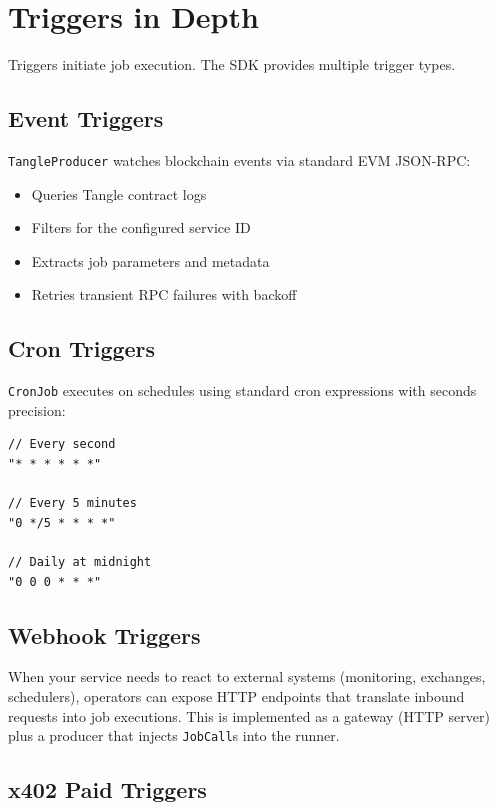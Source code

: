 \documentclass[11pt,a4paper]{article}
\begin{document}
\section{Triggers in Depth}

Triggers initiate job execution. The SDK provides multiple trigger types.

\subsection{Event Triggers}

\texttt{TangleProducer} watches blockchain events via standard EVM JSON-RPC:
\begin{itemize}[noitemsep]
    \item Queries Tangle contract logs
    \item Filters for the configured service ID
    \item Extracts job parameters and metadata
    \item Retries transient RPC failures with backoff
\end{itemize}

\subsection{Cron Triggers}

\texttt{CronJob} executes on schedules using standard cron expressions with seconds precision:
\begin{lstlisting}
// Every second
"* * * * * *"

// Every 5 minutes
"0 */5 * * * *"

// Daily at midnight
"0 0 0 * * *"
\end{lstlisting}

\subsection{Webhook Triggers}

When your service needs to react to external systems (monitoring, exchanges, schedulers), operators can expose HTTP
endpoints that translate inbound requests into job executions. This is implemented as a gateway (HTTP server) plus a
producer that injects \texttt{JobCall}s into the runner.

\subsection{x402 Paid Triggers}
\end{document}
